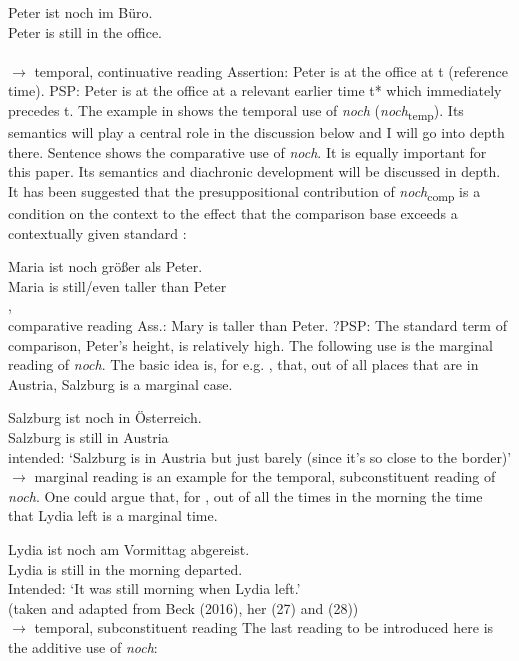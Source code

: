 \documentclass[output=paper,
modfonts
]{langscibook}
\begin{document}
\ea\gll Peter ist noch im Büro.\\
        Peter is still {in the} office.\\
\\ \hfill $\rightarrow$ temporal, continuative reading \label{NOCH_TEMP_cont_EXP}
\z
\ea\ea Assertion: Peter is at the office at t (reference time).
\ex      PSP: Peter is at the office at a relevant earlier time t* which immediately precedes t.
\z\z
The example in  shows the temporal use of \textit{noch} (\textit{noch}\textsubscript{temp}). Its semantics will play a central role in the discussion below and I will go into depth there. Sentence  shows the comparative use of \textit{noch}. It is equally important for this paper. Its semantics and diachronic development will be discussed in depth. It has been suggested that the presuppositional contribution of \textit{noch}\textsubscript{comp} is a condition on the context to the effect that the comparison base exceeds a contextually given standard \citep[e.g.][]{Hofstetter2013}:

\ea\gll Maria ist noch größer als Peter.\\
       Maria is still/even taller than Peter\\
, \\ \hfill comparative reading \label{NOCH_COMP_EXP_0}
\z
\ea\ea Ass.: Mary is taller than Peter.
\ex    ?PSP: The standard term of comparison, Peter's height, is relatively high.
\z\z
The following use is the marginal reading of \textit{noch}. The basic idea is, for e.g. , that, out of all places that are in Austria, Salzburg is a marginal case.

\ea\gll Salzburg ist noch in Österreich.\\
       Salzburg is still in Austria \\
\glt   intended: {`Salzburg is in Austria but just barely (since it's so close to the border)'} \\ \hfill $\rightarrow$ marginal reading \label{NOCH_MARG_deg_EXP}
\z
{} is an example for the temporal, subconstituent reading of \textit{noch}. One could argue that, for , out of all the times in the morning the time that Lydia left is a marginal time.

\ea\gll Lydia ist noch am Vormittag abgereist.\\
       Lydia is still {in the} morning departed.\\
\glt   Intended: {`It was still morning when Lydia left.'}\\ \hfill \small{(taken and adapted from Beck (2016), her (27) and (28))}\\ \normalsize \hfill $\rightarrow$ temporal, subconstituent reading \label{NOCH_TEMP_subconst_EXP}
\z
The last reading to be introduced here is the additive use of \textit{noch}:
\end{document}
